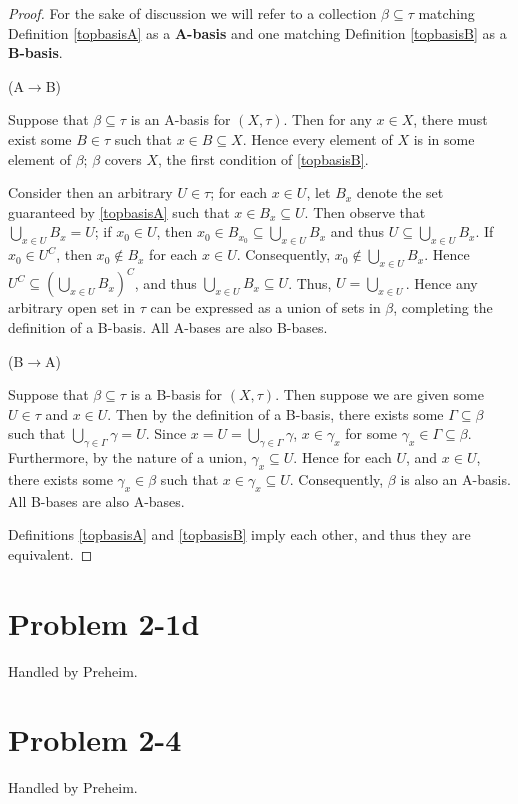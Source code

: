 \documentclass{article}
\theoremstyle{definition}
\newcommand{\p}[1]{\left(#1\right)}
\begin{document}
\begin{proof}
For the sake of discussion we will refer to a collection $\beta \subseteq\tau$ 
matching Definition \ref{topbasisA} as a \textbf{A-basis} 
and one matching Definition \ref{topbasisB} as a \textbf{B-basis}.

(A$\to$B)

Suppose that $\beta\subseteq\tau$ is an A-basis for $(X,\tau)$. Then for any $x \in X$, there must
exist some $B \in \tau$ such that $x \in B \subseteq X$. Hence every element of $X$ is in some
element of $\beta$; $\beta$ covers $X$, the first condition of \ref{topbasisB}. 

Consider then an arbitrary $U \in \tau$; for each $x \in U$, let $B_x$ denote the set guaranteed 
by \ref{topbasisA} such that $x \in B_x \subseteq U$. Then observe that 
$\bigcup_{x\in U} B_x = U$; if $x_0 \in U$, then $x_0 \in B_{x_0} \subseteq \bigcup_{x\in U} B_x$
and thus $U \subseteq \bigcup_{x\in U} B_x$. If $x_0 \in U^C$, then $x_0 \not\in B_x$ for each
$x\in U$. Consequently, $x_0 \not\in\bigcup_{x\in U} B_x$. Hence 
$U^C \subseteq \p{\bigcup_{x\in U} B_x}^C$, and thus $\bigcup_{x\in U} B_x \subseteq U$. Thus,
$U = \bigcup_{x\in U}$. Hence any arbitrary open set in $\tau$ can be expressed as a union of sets
in $\beta$, completing the definition of a B-basis. All A-bases are also B-bases.

(B$\to$A)

Suppose that $\beta\subseteq\tau$ is a B-basis for $(X,\tau)$. Then suppose we are given some 
$U \in \tau$ and $x \in U$. Then by the definition of a B-basis, there exists some 
$\Gamma \subseteq \beta$ such that $\bigcup_{\gamma \in \Gamma} \gamma = U$. Since
$x = U = \bigcup_{\gamma\in\Gamma} \gamma$, $x \in \gamma_x$ for some 
$\gamma_x \in \Gamma \subseteq \beta$. 
Furthermore, by the nature of a union, $\gamma_x \subseteq U$. 
Hence for each $U$, and $x \in U$, there exists some 
$\gamma_x \in \beta$ such that $x \in \gamma_x \subseteq U$. Consequently, $\beta$ is also an
A-basis. All B-bases are also A-bases.

Definitions \ref{topbasisA} and \ref{topbasisB} imply each other, and thus they are equivalent.
\end{proof}

\section{Problem 2-1d}
Handled by Preheim.
\section{Problem 2-4}
Handled by Preheim.
\end{document}
